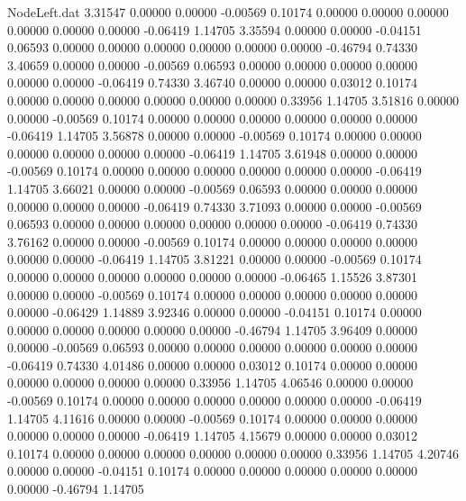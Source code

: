 \begin{filecontents}{NodeLeft.dat}
   3.31547    0.00000    0.00000    -0.00569    0.10174    0.00000    0.00000    0.00000    0.00000    0.00000    0.00000   -0.06419    1.14705
   3.35594    0.00000    0.00000    -0.04151    0.06593    0.00000    0.00000    0.00000    0.00000    0.00000    0.00000   -0.46794    0.74330
   3.40659    0.00000    0.00000    -0.00569    0.06593    0.00000    0.00000    0.00000    0.00000    0.00000    0.00000   -0.06419    0.74330
   3.46740    0.00000    0.00000     0.03012    0.10174    0.00000    0.00000    0.00000    0.00000    0.00000    0.00000    0.33956    1.14705
   3.51816    0.00000    0.00000    -0.00569    0.10174    0.00000    0.00000    0.00000    0.00000    0.00000    0.00000   -0.06419    1.14705
   3.56878    0.00000    0.00000    -0.00569    0.10174    0.00000    0.00000    0.00000    0.00000    0.00000    0.00000   -0.06419    1.14705
   3.61948    0.00000    0.00000    -0.00569    0.10174    0.00000    0.00000    0.00000    0.00000    0.00000    0.00000   -0.06419    1.14705
   3.66021    0.00000    0.00000    -0.00569    0.06593    0.00000    0.00000    0.00000    0.00000    0.00000    0.00000   -0.06419    0.74330
   3.71093    0.00000    0.00000    -0.00569    0.06593    0.00000    0.00000    0.00000    0.00000    0.00000    0.00000   -0.06419    0.74330
   3.76162    0.00000    0.00000    -0.00569    0.10174    0.00000    0.00000    0.00000    0.00000    0.00000    0.00000   -0.06419    1.14705
   3.81221    0.00000    0.00000    -0.00569    0.10174    0.00000    0.00000    0.00000    0.00000    0.00000    0.00000   -0.06465    1.15526
   3.87301    0.00000    0.00000    -0.00569    0.10174    0.00000    0.00000    0.00000    0.00000    0.00000    0.00000   -0.06429    1.14889
   3.92346    0.00000    0.00000    -0.04151    0.10174    0.00000    0.00000    0.00000    0.00000    0.00000    0.00000   -0.46794    1.14705
   3.96409    0.00000    0.00000    -0.00569    0.06593    0.00000    0.00000    0.00000    0.00000    0.00000    0.00000   -0.06419    0.74330
   4.01486    0.00000    0.00000     0.03012    0.10174    0.00000    0.00000    0.00000    0.00000    0.00000    0.00000    0.33956    1.14705
   4.06546    0.00000    0.00000    -0.00569    0.10174    0.00000    0.00000    0.00000    0.00000    0.00000    0.00000   -0.06419    1.14705
   4.11616    0.00000    0.00000    -0.00569    0.10174    0.00000    0.00000    0.00000    0.00000    0.00000    0.00000   -0.06419    1.14705
   4.15679    0.00000    0.00000     0.03012    0.10174    0.00000    0.00000    0.00000    0.00000    0.00000    0.00000    0.33956    1.14705
   4.20746    0.00000    0.00000    -0.04151    0.10174    0.00000    0.00000    0.00000    0.00000    0.00000    0.00000   -0.46794    1.14705

\end{filecontents}
